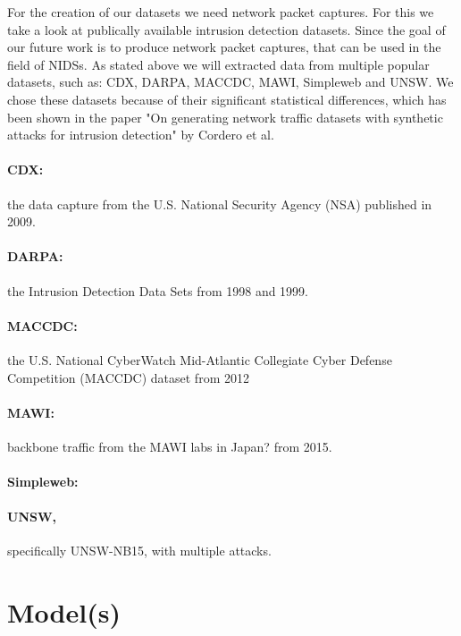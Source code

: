 \documentclass[
	ngerman,
	ruledheaders=section,%
	class=report,%
	thesis={type=bachelor},%
	accentcolor=9c,%
	custommargins=true,%
	marginpar=false,%
	parskip=half-,%
	fontsize=11pt,%
]{tudapub}
\begin{document}
For the creation of our datasets we need network packet captures.
For this we take a look at publically available intrusion detection datasets.
Since the goal of our future work is to produce network packet captures, that can be used in the field of NIDSs.
As stated above we will extracted data from multiple popular datasets, such as: CDX, DARPA, MACCDC, MAWI, Simpleweb and UNSW.
We chose these datasets because of their significant statistical differences, which has been shown in the paper "On generating network traffic datasets with synthetic attacks for intrusion detection" by Cordero et al.

\paragraph{CDX:} the data capture from the U.S. National Security Agency (NSA) published in 2009.

\paragraph{DARPA:} the Intrusion Detection Data Sets from 1998 and 1999.

\paragraph{MACCDC:} the U.S. National CyberWatch Mid-Atlantic Collegiate Cyber Defense Competition (MACCDC) dataset from 2012

\paragraph{MAWI:} backbone traffic from the MAWI labs in Japan? from 2015.

\paragraph{Simpleweb:}

\paragraph{UNSW,} specifically UNSW-NB15, with multiple attacks.

\section{Model(s)}
\end{document}
